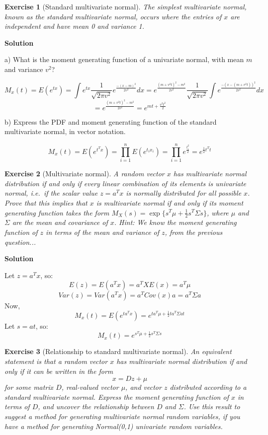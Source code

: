 \documentclass[twoside]{article}
\newcounter{lecnum}
\newtheorem{exercise}{Exercise}[lecnum]
\begin{document}
\color{black}


\begin{exercise}[Standard multivariate normal]
  The simplest multivariate normal, known as the standard multivariate normal, occurs where the entries of $x$ are independent and have mean 0 and variance 1. 
\end{exercise}

\color{blue}
\textbf{Solution}

a) What is the moment generating function of a univariate normal, with mean $m$ and variance $v^2$? 

$$ 
M_x(t) = E(e^{tx}) = \int e^{tx} \frac{1}{\sqrt{2 \pi v^2}} e^{\frac{-(x-m)^2}{2v^2}} dx
= e^{\frac{(m+v^2t)^2-m^2}{2v^2}} \frac{1}{\sqrt{2 \pi v^2}} \int e^{\frac{-(x-(m+v^2t))^2}{2v^2}} dx
	$$
$$
= e^{\frac{(m+v^2t)^2-m^2}{2v^2}} = e^{mt+ \frac{v^2t^2}{2}} 
$$


b) Express the PDF and moment generating function of the standard multivariate normal, in vector notation.

$$
M_x(t) = E(e^{t^Tx}) = \prod_{i=1}^{n} E(e^{t_ix_i}) = \prod_{i=1}^{n} e^{\frac{t_i^2}{2}} = e^{\frac{1}{2} t^Tt}
$$

\color{black}



\begin{exercise}[Multivariate normal]
  A random vector $x$ has multivariate normal distribution if and only if every linear combination of its elements is univariate normal, i.e.\ if the scalar value $z = a^Tx$ is normally distributed for all possible $x$. Prove that this implies that $x$ is multivariate normal if and only if its moment generating function takes the form $M_X(s) = \exp\{s^T\mu + \frac{1}{2}s^T\Sigma s\}$, where $\mu$ and $\Sigma$ are the mean and covariance of $x$. \textit{Hint: We know the moment generating function of $z$ in terms of the mean and variance of $z$, from the previous question...}
\end{exercise}
  
  
\color{blue}
\textbf{Solution}

Let $z=a^Tx$, so:
$$ E(z) = E(a^Tx)= a^TXE(x)=a^T\mu$$
$$ Var(z) =Var(a^Tx)= a^TCov(x)a = a^T\Sigma a$$
Now,
$$ M_x(t)= E(e^{ta^Tx}) = e^{ta^T\mu + \frac{1}{2}ta^T\Sigma at} $$
Let $s=at$, so:
$$  M_x(t)= e^{s^T\mu + \frac{1}{2}s^T\Sigma s} $$

\color{black}

  
\begin{exercise}[Relationship to standard multivariate normal]
  An equivalent statement is that a random vector $x$ has multivariate normal distribution if and only if it can be written in the form
  $$x = Dz + \mu$$
  for some matrix $D$, real-valued vector $\mu$, and vector $z$ distributed according to a standard multivariate normal. Express the moment generating function of $x$ in terms of $D$, and uncover the relationship between $D$ and $\Sigma$. Use this result to suggest a method for generating multivariate normal random variables, if you have a method for generating Normal(0,1) univariate random variables.
\end{exercise}
\end{document}
